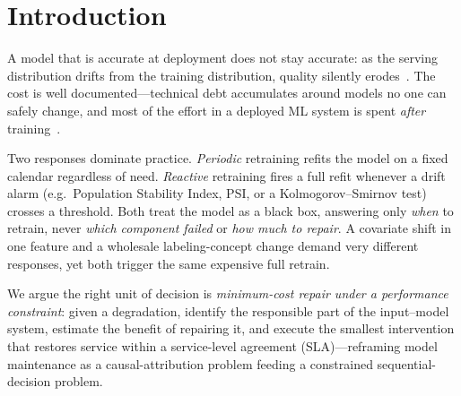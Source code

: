 \documentclass[conference]{IEEEtran}
\begin{document}
\section{Introduction}
A model that is accurate at deployment does not stay accurate: as the
serving distribution drifts from the training distribution, quality
silently erodes~\cite{gama2014survey,lu2018learning,quinonero2009dataset}.
The cost is well documented---technical debt accumulates around models no
one can safely change, and most of the effort in a deployed ML system is
spent \emph{after} training~\cite{sculley2015debt,paleyes2022challenges}.

Two responses dominate practice. \emph{Periodic} retraining refits the
model on a fixed calendar regardless of need. \emph{Reactive} retraining
fires a full refit whenever a drift alarm (e.g.\ Population Stability
Index, PSI, or a Kolmogorov--Smirnov test) crosses a threshold. Both treat
the model as a black box, answering only \emph{when} to retrain, never
\emph{which component failed} or \emph{how much to repair}. A covariate
shift in one feature and a wholesale labeling-concept change demand very
different responses, yet both trigger the same expensive full retrain.

We argue the right unit of decision is \emph{minimum-cost repair under a
performance constraint}: given a degradation, identify the responsible
part of the input--model system, estimate the benefit of repairing it, and
execute the smallest intervention that restores service within a
service-level agreement (SLA)---reframing model maintenance as a
causal-attribution problem feeding a constrained sequential-decision
problem.
\end{document}
